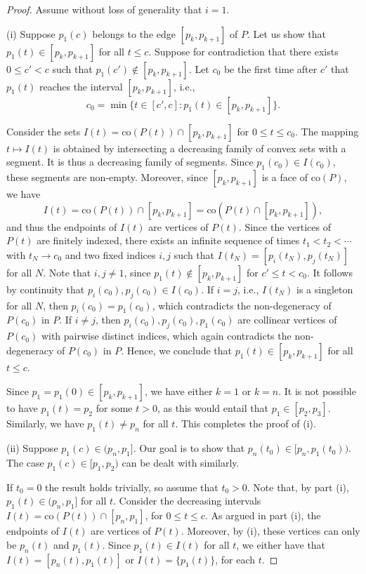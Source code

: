 \documentclass[11pt]{amsart}
\theoremstyle{remark}
\numberwithin{equation}{section}
\newcommand{\co}{\mathrm{co}}
\renewcommand{\leq}{\leqslant}
\begin{document}
\begin{proof}
Assume without loss of generality that $i=1$. 

(i) Suppose $p_1(c)$ belongs to the edge $[p_k,p_{k+1}]$ of $P$. Let us show that $p_1(t)\in [p_k,p_{k+1}]$ for all $t\leq c$. Suppose for contradiction that there exists $0\leq c'<c$ such that $p_1(c')\notin [p_k,p_{k+1}]$. Let $c_0$ be the first time after $c'$ that $p_1(t)$ reaches the interval $[p_k,p_{k+1}]$, i.e.,
\[
c_0=\min \{t\in [c',c]: p_1(t)\in [p_k,p_{k+1}]\}.
\] 



Consider the sets $I(t) = \co (P(t)) \cap [p_k,p_{k+1}]$ for $0\leq t\leq c_0$. The mapping $t\mapsto I(t)$ is obtained by intersecting a decreasing family of convex sets with a segment. It is thus a decreasing family of segments. Since $p_1(c_0)\in I(c_0)$, these segments are non-empty. Moreover, since $[p_k,p_{k+1}]$ is a face of $\co(P)$, we have 
\[
I(t) = \co (P(t)) \cap [p_k,p_{k+1}] = \co(P(t)\cap [p_k,p_{k+1}]), 
\]
and thus the endpoints of $I(t)$ are vertices of $P(t)$. Since the vertices of $P(t)$ are finitely indexed, there exists an infinite sequence of times $t_1<t_2<\cdots$ with $t_N\to c_0$ and two fixed indices $i,j$ such that $I(t_N)=[p_i(t_N),p_j(t_N)]$ for all $N$. Note that $i,j\neq 1$, since $p_1(t)\notin [p_k,p_{k+1}]$ for $c'\leq t<c_0$. It follows by continuity that $p_i(c_0),p_j(c_0)\in I(c_0)$. If $i=j$, i.e., $I(t_N)$ is a singleton for all $N$, then  $p_i(c_0)=p_1(c_0)$, which contradicts the non-degeneracy of $P(c_0)$ in $P$. If $i\neq j$, then $p_i(c_0),p_j(c_0),p_1(c_0)$ are collinear vertices of $P(c_0)$ with pairwise distinct indices, which again contradicts the non-degeneracy of $P(c_0)$ in $P$. Hence, we conclude that $p_1(t)\in [p_k,p_{k+1}]$ for all $t\leq c$.


Since $p_1=p_1(0)\in [p_{k},p_{k+1}]$, we have either $k=1$ or $k=n$. It is not possible to have $p_1(t)=p_2$ for some $t>0$, as this would entail that $p_1\in [p_2,p_3]$. Similarly, we have $p_1(t)\neq p_n$ for all $t$. This completes the proof of (i).


(ii) Suppose $p_1(c)\in (p_n,p_1]$. Our goal is to show that $p_n(t_0)\in [p_n,p_1(t_0))$.
The case $p_1(c)\in [p_1,p_2)$ can be dealt with similarly. 

If $t_0=0$ the result holds trivially, so assume that $t_0>0$. Note that, by part (i), $p_1(t)\in (p_n,p_1]$ for all $t$. 
Consider the decreasing intervals $I(t)=\co(P(t))\cap [p_n,p_1]$, for $0\leq t\leq c$. As argued in part (i), the endpoints of $I(t)$ are vertices of $P(t)$. Moreover, by (i),  these vertices can only be $p_n(t)$ and $p_1(t)$. Since $p_1(t)\in I(t)$ for all $t$, we either have that $I(t)=[p_n(t),p_1(t)]$ or $I(t)=\{p_1(t)\}$, for each $t$.


\end{proof}
\end{document}
